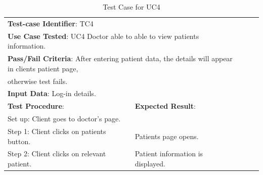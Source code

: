 \documentclass[a4paper]{article}
\begin{document}
\begin{table}[h!]
\centering
\caption*{Test Case for UC4}
\label{TC4}
\begin{tabular}{lllll}
\cline{1-2}

\multicolumn{2}{|l|}{\textbf{Test-case Identifier}: TC4}  &  &  &  \\

\multicolumn{2}{|l|}{\textbf{Use Case Tested}: UC4 Doctor able to able to view patients information.}  &  &  &  \\

\multicolumn{2}{|l|}{\textbf{Pass/Fail Criteria}: After entering patient data, the details will appear in clients patient page,}  &  &  &  \\

\multicolumn{2}{|l|}{otherwise test fails.}  &  &  &  \\

\multicolumn{2}{|l|}{\textbf{Input Data}: Log-in details.}  &  &  &  \\

\cline{1-2}

\multicolumn{1}{|l|}{\textbf{Test Procedure}:} & \multicolumn{1}{l|}{\textbf{Expected Result}:} &  &  &  \\ 

\cline{1-2}

\multicolumn{1}{|l|}{Set up: Client goes to doctor's page.} & \multicolumn{1}{l|}{} &  &  &  \\

\multicolumn{1}{|l|}{Step 1: Client clicks on patients button.} & \multicolumn{1}{l|}{Patients page opens.} &  &  &  \\

\multicolumn{1}{|l|}{Step 2: Client clicks on relevant patient.} & \multicolumn{1}{l|}{Patient information is displayed.} &  &  &  \\

\cline{1-2}

\end{tabular}
\end{table}

\FloatBarrier
\end{document}
